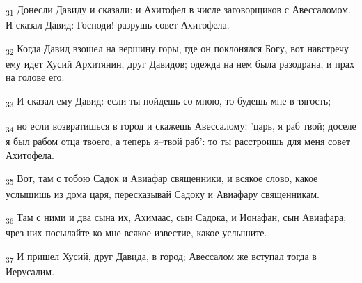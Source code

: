 \begin{tcolorbox}
\textsubscript{31} Донесли Давиду и сказали: и Ахитофел в числе заговорщиков с Авессаломом. И сказал Давид: Господи! разрушь совет Ахитофела.
\end{tcolorbox}
\begin{tcolorbox}
\textsubscript{32} Когда Давид взошел на вершину горы, где он поклонялся Богу, вот навстречу ему идет Хусий Архитянин, друг Давидов; одежда на нем была разодрана, и прах на голове его.
\end{tcolorbox}
\begin{tcolorbox}
\textsubscript{33} И сказал ему Давид: если ты пойдешь со мною, то будешь мне в тягость;
\end{tcolorbox}
\begin{tcolorbox}
\textsubscript{34} но если возвратишься в город и скажешь Авессалому: 'царь, я раб твой; доселе я был рабом отца твоего, а теперь я--твой раб': то ты расстроишь для меня совет Ахитофела.
\end{tcolorbox}
\begin{tcolorbox}
\textsubscript{35} Вот, там с тобою Садок и Авиафар священники, и всякое слово, какое услышишь из дома царя, пересказывай Садоку и Авиафару священникам.
\end{tcolorbox}
\begin{tcolorbox}
\textsubscript{36} Там с ними и два сына их, Ахимаас, сын Садока, и Ионафан, сын Авиафара; чрез них посылайте ко мне всякое известие, какое услышите.
\end{tcolorbox}
\begin{tcolorbox}
\textsubscript{37} И пришел Хусий, друг Давида, в город; Авессалом же вступал тогда в Иерусалим.
\end{tcolorbox}
